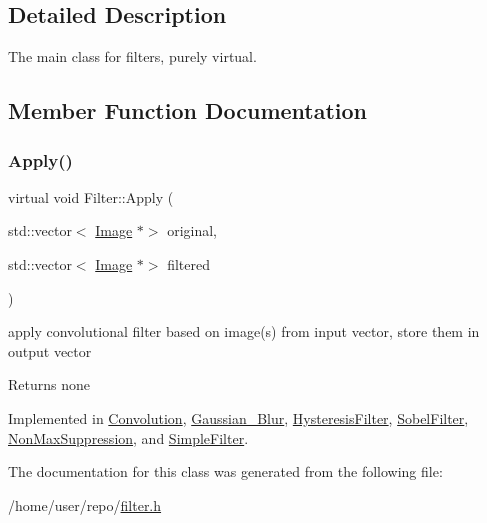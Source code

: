 \subsection{Detailed Description}
The main class for filters, purely virtual. 

\subsection{Member Function Documentation}
\mbox{\label{classFilter_afab0d50af44a19a370ebe46c69b8ff4e}} 
\subsubsection{\texorpdfstring{Apply()}{Apply()}}
{\footnotesize\ttfamily virtual void Filter\+::\+Apply (\begin{DoxyParamCaption}\item[{std\+::vector$<$ \hyperlink{classImage}{Image} $\ast$$>$}]{original,  }\item[{std\+::vector$<$ \hyperlink{classImage}{Image} $\ast$$>$}]{filtered }\end{DoxyParamCaption})\hspace{0.3cm}{\ttfamily [pure virtual]}}



apply convolutional filter based on image(s) from input vector, store them in output vector 

\begin{DoxyReturn}{Returns}
none 
\end{DoxyReturn}


Implemented in \hyperlink{classConvolution_ad18fa18c52d8156b82b97bcfebbdaf85}{Convolution}, \hyperlink{classGaussian__Blur_aac260e4900fda92755855a6d52d1be0d}{Gaussian\+\_\+\+Blur}, \hyperlink{classHysteresisFilter_af2d6c50bc0cfd609fbf7e90f01b03b1f}{Hysteresis\+Filter}, \hyperlink{classSobelFilter_a9c8136932e8d9c7cb7dd785cf9dbfefe}{Sobel\+Filter}, \hyperlink{classNonMaxSuppression_a430a98e5683f8f70e7d8aaaa6efee5e8}{Non\+Max\+Suppression}, and \hyperlink{classSimpleFilter_a4400a0f97e26e84a33befd537fb4fea8}{Simple\+Filter}.



The documentation for this class was generated from the following file\+:\begin{DoxyCompactItemize}
\item 
/home/user/repo/\hyperlink{filter_8h}{filter.\+h}\end{DoxyCompactItemize}
